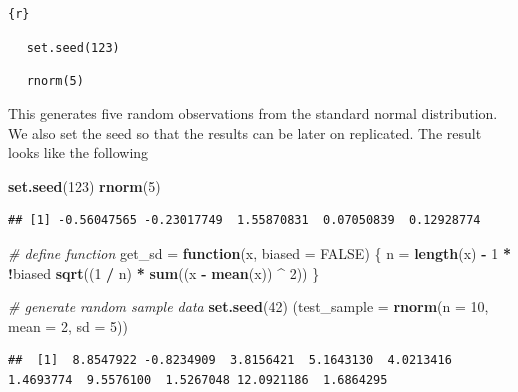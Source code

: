 \documentclass[
]{book}
\newenvironment{Shaded}{\begin{snugshade}}{\end{snugshade}}
\newcommand{\CommentTok}[1]{\textcolor[rgb]{0.56,0.35,0.01}{\textit{#1}}}
\newcommand{\ControlFlowTok}[1]{\textcolor[rgb]{0.13,0.29,0.53}{\textbf{#1}}}
\newcommand{\DataTypeTok}[1]{\textcolor[rgb]{0.13,0.29,0.53}{#1}}
\newcommand{\DecValTok}[1]{\textcolor[rgb]{0.00,0.00,0.81}{#1}}
\newcommand{\KeywordTok}[1]{\textcolor[rgb]{0.13,0.29,0.53}{\textbf{#1}}}
\newcommand{\NormalTok}[1]{#1}
\newcommand{\OperatorTok}[1]{\textcolor[rgb]{0.81,0.36,0.00}{\textbf{#1}}}
\newcommand{\OtherTok}[1]{\textcolor[rgb]{0.56,0.35,0.01}{#1}}
\newcommand{\StringTok}[1]{\textcolor[rgb]{0.31,0.60,0.02}{#1}}
\begin{document}
\texttt{\textasciigrave{}\textasciigrave{}\textasciigrave{}\{r\}}

\(\quad\) \texttt{set.seed(123)}

\(\quad\) \texttt{rnorm(5)}

\texttt{\textasciigrave{}\textasciigrave{}\textasciigrave{}}

This generates five random observations from the standard normal distribution. We also set the seed so that the results can be later on replicated. The result looks like the following

\begin{Shaded}
\begin{Highlighting}[]
  \KeywordTok{set.seed}\NormalTok{(}\DecValTok{123}\NormalTok{)}
  \KeywordTok{rnorm}\NormalTok{(}\DecValTok{5}\NormalTok{)}
\end{Highlighting}
\end{Shaded}

\begin{verbatim}
## [1] -0.56047565 -0.23017749  1.55870831  0.07050839  0.12928774
\end{verbatim}

\begin{Shaded}
\begin{Highlighting}[]
  \CommentTok{# define function}
\NormalTok{  get_sd =}\StringTok{ }\ControlFlowTok{function}\NormalTok{(x, }\DataTypeTok{biased =} \OtherTok{FALSE}\NormalTok{) \{}
\NormalTok{    n =}\StringTok{ }\KeywordTok{length}\NormalTok{(x) }\OperatorTok{-}\StringTok{ }\DecValTok{1} \OperatorTok{*}\StringTok{ }\OperatorTok{!}\NormalTok{biased}
    \KeywordTok{sqrt}\NormalTok{((}\DecValTok{1} \OperatorTok{/}\StringTok{ }\NormalTok{n) }\OperatorTok{*}\StringTok{ }\KeywordTok{sum}\NormalTok{((x }\OperatorTok{-}\StringTok{ }\KeywordTok{mean}\NormalTok{(x)) }\OperatorTok{^}\StringTok{ }\DecValTok{2}\NormalTok{))}
\NormalTok{  \}}
  
  \CommentTok{# generate random sample data}
  \KeywordTok{set.seed}\NormalTok{(}\DecValTok{42}\NormalTok{)}
\NormalTok{  (}\DataTypeTok{test_sample =} \KeywordTok{rnorm}\NormalTok{(}\DataTypeTok{n =} \DecValTok{10}\NormalTok{, }\DataTypeTok{mean =} \DecValTok{2}\NormalTok{, }\DataTypeTok{sd =} \DecValTok{5}\NormalTok{))}
\end{Highlighting}
\end{Shaded}

\begin{verbatim}
##  [1]  8.8547922 -0.8234909  3.8156421  5.1643130  4.0213416  1.4693774  9.5576100  1.5267048 12.0921186  1.6864295
\end{verbatim}
\end{document}
